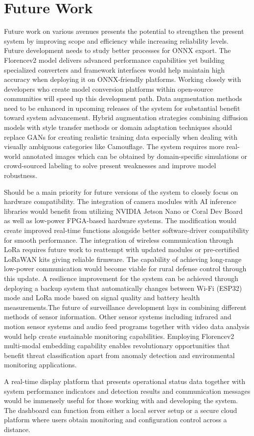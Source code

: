 \documentclass[fleqn,10pt,lineno]{wlpeerj}
\begin{document}
\section{Future Work}
Future work on various avenues presents the potential to strengthen the present system by improving scope and efficiency while increasing reliability levels. Future development needs to study better processes for ONNX export. The Florencev2 model delivers advanced performance capabilities yet building specialized converters and framework interfaces would help maintain high accuracy when deploying it on ONNX-friendly platforms. Working closely with developers who create model conversion platforms within open-source communities will speed up this development path. Data augmentation methods need to be enhanced in upcoming releases of the system for substantial benefit toward system advancement. Hybrid augmentation strategies combining diffusion models with style transfer methods or domain adaptation techniques should replace GANs for creating realistic training data especially when dealing with visually ambiguous categories like Camouflage. The system requires more real-world annotated images which can be obtained by domain-specific simulations or crowd-sourced labeling to solve present weaknesses and improve model robustness. 

Should be a main priority for future versions of the system to closely focus on hardware compatibility. The integration of camera modules with AI inference libraries would benefit from utilizing NVIDIA Jetson Nano or Coral Dev Board as well as low-power FPGA-based hardware systems. The modification would create improved real-time functions alongside better software-driver compatibility for smooth performance. The integration of wireless communication through LoRa requires future work to reattempt with updated modules or pre-certified LoRaWAN kits giving reliable firmware. The capability of achieving long-range low-power communication would become viable for rural defense control through this update. A resilience improvement for the system can be achieved through deploying a backup system that automatically changes between Wi-Fi (ESP32) mode and LoRa mode based on signal quality and battery health measurements.The future of surveillance development lays in combining different methods of sensor information. Other sensor systems including infrared and motion sensor systems and audio feed programs together with video data analysis would help create sustainable monitoring capabilities. Employing Florencev2 multi-modal embedding capability enables revolutionary opportunities that benefit threat classification apart from anomaly detection and environmental monitoring applications. 

A real-time display platform that presents operational status data together with system performance indicators and detection results and communication messages would be immensely useful for those working with and developing the system. The dashboard can function from either a local server setup or a secure cloud platform where users obtain monitoring and configuration control across a distance.

\printbibliography
\end{document}
